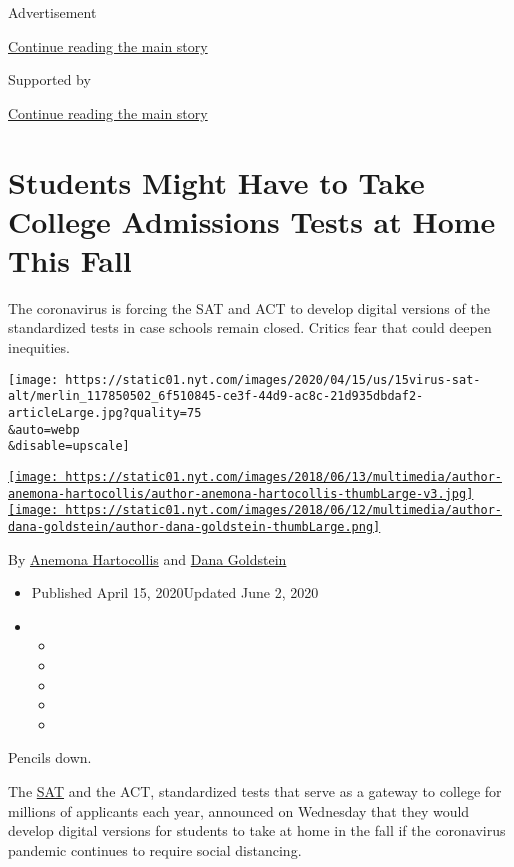 Advertisement

\protect\hyperlink{after-top}{Continue reading the main story}

Supported by

\protect\hyperlink{after-sponsor}{Continue reading the main story}

\hypertarget{students-might-have-to-take-college-admissions-tests-at-home-this-fall}{%
\section{Students Might Have to Take College Admissions Tests at Home
This
Fall}\label{students-might-have-to-take-college-admissions-tests-at-home-this-fall}}

The coronavirus is forcing the SAT and ACT to develop digital versions
of the standardized tests in case schools remain closed. Critics fear
that could deepen inequities.

\texttt{[image: https://static01.nyt.com/images/2020/04/15/us/15virus-sat-alt/merlin\_117850502\_6f510845-ce3f-44d9-ac8c-21d935dbdaf2-articleLarge.jpg?quality=75\\\&auto=webp\\\&disable=upscale]}

\href{https://www.nytimes.com/by/anemona-hartocollis}{\texttt{[image: https://static01.nyt.com/images/2018/06/13/multimedia/author-anemona-hartocollis/author-anemona-hartocollis-thumbLarge-v3.jpg]}}\href{https://www.nytimes.com/by/dana-goldstein}{\texttt{[image: https://static01.nyt.com/images/2018/06/12/multimedia/author-dana-goldstein/author-dana-goldstein-thumbLarge.png]}}

By \href{https://www.nytimes.com/by/anemona-hartocollis}{Anemona
Hartocollis} and \href{https://www.nytimes.com/by/dana-goldstein}{Dana
Goldstein}

\begin{itemize}
\item
  Published April 15, 2020Updated June 2, 2020
\item
  \begin{itemize}
  \item
  \item
  \item
  \item
  \item
  \end{itemize}
\end{itemize}

Pencils down.

The
\href{https://www.nytimes.com/2020/06/02/us/at-home-sat-coronavirus.html}{SAT}
and the ACT, standardized tests that serve as a gateway to college for
millions of applicants each year, announced on Wednesday that they would
develop digital versions for students to take at home in the fall if the
coronavirus pandemic continues to require social distancing.

